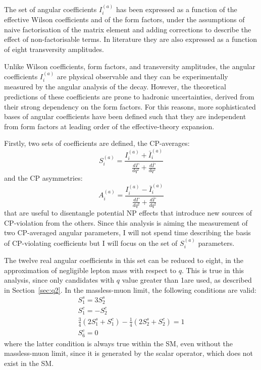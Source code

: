 The set of angular coefficients $I_i^{(a)}$ has been expressed as a function of the effective Wilson coefficients and of the form factors, under the assumptions of naive factorisation of the matrix element and adding corrections to describe the effect of non-factorisable terms.
In literature they are also expressed as a function of eight \Ks transversity amplitudes.

Unlike Wilson coefficients, form factors, and transversity amplitudes, the angular coefficients $I_i^{(a)}$ are physical observable and they can be experimentally measured by the angular analysis of the \BtoKstmumudecay decay.
However, the theoretical predictions of these coefficients are prone to hadronic uncertainties, derived from their strong dependency on the form factors.
For this reasons, more sophisticated bases of angular coefficients have been defined such that they are independent from form factors at leading order of the effective-theory expansion.

Firstly, two sets of coefficients are defined, the CP-averages:
\begin{equation}
  S^{(a)}_i = \frac{ I^{(a)}_i + \bar I^{(a)}_i }{\frac{d\Gamma}{dq^2} + \frac{d\bar\Gamma}{dq^2}}
  \label{eq:Ss}
\end{equation}
and the CP asymmetries:
\begin{equation}
  A^{(a)}_i = \frac{ I^{(a)}_i - \bar I^{(a)}_i }{\frac{d\Gamma}{dq^2}+\frac{d\bar\Gamma}{dq^2}}
  \label{eq:As}
\end{equation}
that are useful to disentangle potential NP effects that introduce new sources of CP-violation from the others.
Since this analysis is aiming the measurement of two CP-averaged angular parameters, I will not spend time describing the basis of CP-violating coefficients but I will focus on the set of $S^{(a)}_i$ parameters.

The twelve real angular coefficients in this set can be reduced to eight, in the approximation of negligible lepton mass with respect to $q$.
This is true in this analysis, since only candidates with $q$ value greater than 1\GeV are used, as described in Section~\ref{sec:q2}.
In the massless-muon limit, the following conditions are valid:
\begin{gather}
  S_1^s = 3 S_2^s \nonumber\\
  S_1^c = - S_2^c \nonumber\\
  \frac{3}{4}\left(2S_1^s+S_1^c\right)-\frac{1}{4}\left(2S_2^s+S_2^c\right) = 1 \nonumber\\
  S_6^c = 0 \label{eq:massless-reductions}
\end{gather}
where the latter condition is always true within the SM, even without the massless-muon limit, since it is generated by the scalar operator, which does not exist in the SM.

